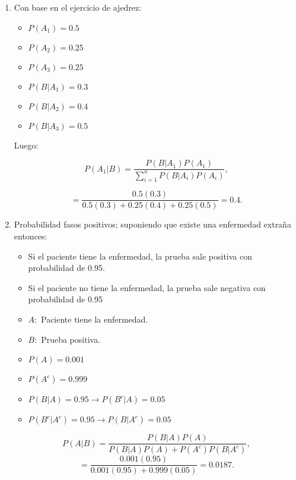 \documentclass[a4paper]{book}
\begin{document}
\begin{enumerate}[{Ej 1: }]
    \item Con base en el ejercicio de ajedrez:
        \begin{itemize}
           \item \(P\left(A_1\right)=0.5\)
           \item \(P\left(A_2\right)=0.25\)
           \item \(P\left(A_3\right)=0.25\)
        \end{itemize}

        \begin{itemize}
            \item \(P\left(B|A_1\right)=0.3\)
            \item \(P\left(B|A_2\right)=0.4\)
            \item \(P\left(B|A_3\right)=0.5\)
        \end{itemize}

        Luego:

        \[
            P\left(A_1|B\right) = \frac{P\left(B|A_1\right)P\left(A_1\right)}{\sum_{i=1}^{n} P\left(B|A_{i}\right)P\left(A_{i}\right)}
        ,\]

        \[
        = \frac{0.5\left(0.3\right)}{0.5\left(0.3\right)+0.25\left(0.4\right)+0.25\left(0.5\right)} = 0.4
        .\]

    \item Probabilidad fasos positivos; suponiendo que existe una enfermedad extraña entonces:
        \begin{itemize}
            \item Si el paciente tiene la enfermedad, la prueba sale positiva
                con probabilidad de 0.95.
            \item Si el paciente no tiene la enfermedad, la prueba sale
                negativa con probabilidad de 0.95
        \end{itemize}
        \begin{itemize}
            \item \(A:\) Paciente tiene la enfermedad.
            \item \(B:\) Prueba positiva.
        \end{itemize}
        \begin{itemize}
            \item \(P\left(A\right)=0.001\)
            \item \(P\left(A^{c}\right)=0.999\)
        \end{itemize}
        \begin{itemize}
            \item \(P\left(B|A\right)=0.95 \to P\left(B^{c}|A\right)=0.05\)
            \item \(P\left(B^{c}|A^{c}\right)=0.95\to P\left(B|A^{c}\right)=0.05\)
        \end{itemize}
        \[
        P\left(A|B\right)=\frac{P\left(B|A\right)P\left(A\right) }{P\left(B|A\right)P\left(A\right)+P\left(A^{c}\right)P\left(B|A^{c}\right)}
        ,\]
        \[
        =\frac{0.001\left(0.95\right)}{0.001\left(0.95\right)+0.999\left(0.05\right)}=0.0187
        .\]

\end{enumerate}
\end{document}
